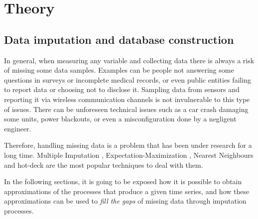 
\chapter{Theory}
\label{cha:theory}

\section{Data imputation and database construction}


In general, when measuring any variable and collecting data there is always a risk of missing some data samples. Examples can be people not answering some questions in surveys or incomplete medical records, or even public entities failing to report data or choosing not to disclose it. Sampling data from sensors and reporting it via wireless communication channels is not invulnerable to this type of issues. There can be unforeseen technical issues such as a car crash damaging some units, power blackouts, or even a misconfiguration done by a negligent engineer.

Therefore, handling missing data is a problem that has been under research for a long time. Multiple Imputation \cite{imputationRubin}, Expectation-Maximization \cite{imputationEM}, Nearest Neighbours \cite{imputationNN} and hot-deck \cite{imputationHotDeck} are the most popular techniques to deal with them.

In the following sections, it is going to be exposed how it is possible to obtain approximations of the processes that produce a given time series, and how these approximations can be used to \emph{fill the gaps} of missing data through imputation processes.

%
%



